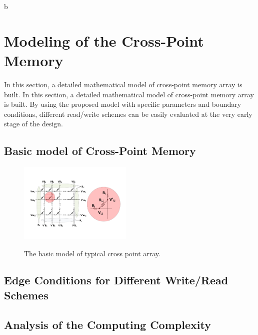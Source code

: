\vspace{10pt}
b
\section{Modeling of the Cross-Point Memory}\label{sec:model}
In this section, a detailed mathematical model of cross-point memory array is built.
In this section, a detailed mathematical model of cross-point memory array
is built. By using the proposed model with specific parameters and
boundary conditions, different read/write schemes can be easily evaluated
at the very early stage of the design.

\subsection{Basic model of Cross-Point Memory}

\begin{figure}
\centering
  \includegraphics[width=0.48\textwidth]{./figures/model.pdf}\\
  \caption{The basic model of typical cross point array.}\label{fig:modeling}
\end{figure}
\subsection{Edge Conditions for Different Write/Read Schemes}

\subsection{Analysis of the Computing Complexity}
